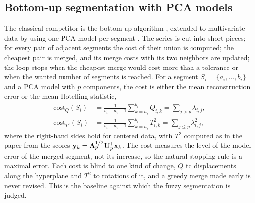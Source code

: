 \subsection{Bottom-up segmentation with PCA models}\label{sec:ts:bottomup}

The classical competitor is the bottom-up algorithm \cite{keogh:2001:online}, extended to multivariate data by using one PCA model per segment \cite{abonyi:2005:segmentation}. The series is cut into short pieces; for every pair of adjacent segments the cost of their union is computed; the cheapest pair is merged, and its merge costs with its two neighbors are updated; the loop stops when the cheapest merge would cost more than a tolerance or when the wanted number of segments is reached. For a segment $S_i=\{a_i,\dots,b_i\}$ and a PCA model with $p$ components, the cost is either the mean reconstruction error or the mean Hotelling statistic,
\begin{equation}
  \begin{aligned}
  \mathrm{cost}_Q(S_i)&=\frac{1}{b_i-a_i+1}\sum_{k=a_i}^{b_i}Q_{i,k}=\sum_{j>p}\lambda_{i,j},\\
  \mathrm{cost}_{T^2}(S_i)&=\frac{1}{b_i-a_i+1}\sum_{k=a_i}^{b_i}T^2_{i,k}=\sum_{j\le p}\lambda_{i,j}^2,
  \end{aligned}
  \label{eq:ts:bucost}
\end{equation}
where the right-hand sides hold for centered data, with $T^2$ computed as in the paper from the scores $\mathbf{y}_k=\boldsymbol\Lambda_p^{1/2}\mathbf{U}_p^{\mathsf{T}}\mathbf{x}_k$. The cost measures the level of the model error of the merged segment, not its increase, so the natural stopping rule is a maximal error. Each cost is blind to one kind of change, $Q$ to displacements along the hyperplane and $T^2$ to rotations of it, and a greedy merge made early is never revised. This is the baseline against which the fuzzy segmentation is judged.

